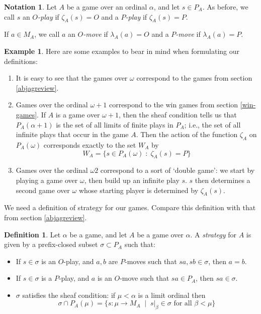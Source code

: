 \documentclass[11pt]{article} %
\theoremstyle{plain} %
\theoremstyle{definition} %
\newtheorem{definition}[theorem]{Definition}
\newtheorem{notation}[theorem]{Notation}
\newtheorem{example}[theorem]{Example}
\theoremstyle{exercisestyle}
\newcommand*\from{\colon}
\newcommand{\cmap}[3]{#1\from{}#2\to{}#3}
\newcommand{\suchthat}{\;\colon\;}
\newcommand{\varsuchthat}{\;\mid\;}
\begin{document}
\begin{notation}
  Let $A$ be a game over an ordinal $\alpha$, and let $s\in P_A$.  As before, we call $s$ an \emph{$O$-play} if $\zeta_A(s)=O$ and a \emph{$P$-play} if $\zeta_A(s)=P$.  

  If $a\in M_A$, we call $a$ an \emph{$O$-move} if $\lambda_A(a)=O$ and a \emph{$P$-move} if $\lambda_A(a)=P$.
\end{notation}

\begin{example}
  Here are some examples to bear in mind when formulating our definitions:
  \begin{enumerate}
    \item It is easy to see that the games over $\omega$ correspond to the games from section \ref{abjagreview}.  
    \item Games over the ordinal $\omega+1$ correspond to the win games from section \ref{win-games}.  If $A$ is a game over $\omega+1$, then the sheaf condition tells us that $P_A(\alpha+1)$ is the set of all limits of finite plays in $P_A$; i.e., the set of all infinite plays that occur in the game $A$.  Then the action of the function $\zeta_A$ on $P_A(\omega)$ corresponds exactly to the set $W_A$ by
      \[
        W_A=\{s\in P_A(\omega)\suchthat \zeta_A(s)=P\}
      \]
    \item Games over the ordinal $\omega2$ correspond to a sort of `double game': we start by playing a game over $\omega$, then build up an infinite play $s$.  $s$ then determines a second game over $\omega$ whose starting player is determined by $\zeta_A(s)$.  
  \end{enumerate}
\end{example}

We need a definition of strategy for our games.  Compare this definition with that from section \ref{abjagreview}.

\begin{definition}
  Let $\alpha$ be a game, and let $A$ be a game over $\alpha$.  A \emph{strategy} for $A$ is given by a prefix-closed subset $\sigma\subset P_A$ such that:
  \begin{itemize}
    \item If $s\in\sigma$ is an $O$-play, and $a,b$ are $P$-moves such that $sa,sb\in\sigma$, then $a=b$.
    \item If $s\in\sigma$ is a $P$-play, and $a$ is an $O$-move such that $sa\in P_A$, then $sa\in\sigma$.  
    \item $\sigma$ satisfies the sheaf condition: if $\mu<\alpha$ is a limit ordinal then
      \[
        \sigma\cap P_A(\mu)=\{\cmap{s}{\mu}{M_A}\varsuchthat s\vert_\beta\in\sigma\textrm{ for all }\beta<\mu\}
      \]
  \end{itemize}
\end{definition}
\end{document}
